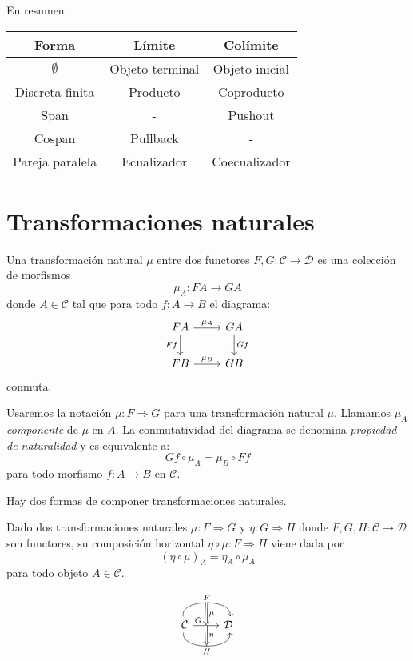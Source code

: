 \documentclass[12pt, twoside]{book}
\newcommand{\newterm}[1]{\index{#1}\emph{#1}}
\newcommand{\cat}{{\mathcal{C}}}
\begin{document}
En resumen:

\begin{center}
\begin{tabular}{ c | c | c }
  Forma & Límite & Colímite\\
  \hline
  $\emptyset$ & Objeto terminal & Objeto inicial \\
  Discreta finita & Producto & Coproducto \\
  Span & - & Pushout \\
  Cospan & Pullback & - \\
  Pareja paralela & Ecualizador & Coecualizador
\end{tabular}
\end{center}

\section{Transformaciones naturales}
\begin{definition}
Una transformación natural $\mu$ entre dos functores $F, G \colon \cat \to \mathcal{D}$ es una colección de morfismos
\[ \mu_A \colon F A \to G A \]
donde $A \in \cat$ tal que para todo $f \colon A \to B$ el diagrama:
\[
\begin{tikzcd}
F A \arrow[r,"\mu_A"] \arrow[d,"F f" left] & G A \arrow[d,"G f"]\\
F B \arrow[r,"\mu_B"] & G B
\end{tikzcd}
\]
conmuta.
\end{definition}

Usaremos la notación $\mu \colon F \Rightarrow G$ para una transformación natural $\mu$.
Llamamos $\mu_A$ \newterm{componente} de $\mu$ en $A$.
La conmutatividad del diagrama se denomina \emph{propiedad de naturalidad} y es equivalente a:
\[ G f \circ \mu_A = \mu_B \circ F f \]
para todo morfismo $f \colon A \to B$ en $\cat$.

Hay dos formas de componer transformaciones naturales.
\begin{definition}
Dado dos transformaciones naturales $\mu \colon F \Rightarrow G$ y $\eta \colon G \Rightarrow H$ donde $F,G,H \colon \cat \to \mathcal{D}$ son functores, su composición horizontal $\eta \circ \mu \colon F \Rightarrow H$ viene dada por
\[ (\eta \circ \mu)_A = \eta_A \circ \mu_A \]
para todo objeto $A \in \cat$.
\end{definition}
\[ \begin{tikzcd}{\cat} \arrow[r,"F", bend left=100, ""{name=U}] \arrow[r,"G", pos=0.2,""{name=M, pos=0.5,below},""{name=M', pos=0.5,above}] \arrow[r,"H" below, bend right=100, ""{name=D, below}] & \mathcal{D}\\
\arrow[Rightarrow, from=U, to=M, "\mu"] \arrow[Rightarrow, from=M', to=D, "\eta"]\end{tikzcd}\]
\end{document}
